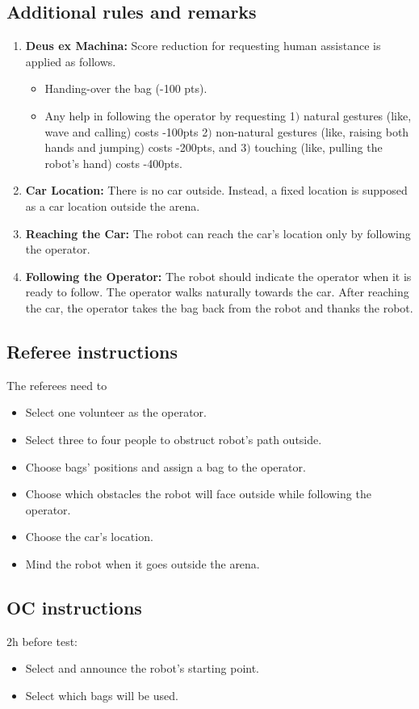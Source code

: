 \subsection{Additional rules and remarks}
\begin{enumerate}[nosep]
	\item \textbf{Deus ex Machina:} Score reduction for requesting human assistance is applied as follows.
	\begin{itemize}
		\item Handing-over the bag (-100 pts).
		\item Any help in following the operator by requesting 1$)$ natural gestures (like, wave and calling) costs -100pts 2$)$ non-natural gestures (like, raising both hands and jumping) costs -200pts, and 3$)$ touching (like, pulling the robot's hand) costs -400pts.
	\end{itemize}

	\item \textbf{Car Location:} There is no car outside. Instead, a fixed location is supposed as a car location outside the arena.

	\item \textbf{Reaching the Car:} The robot can reach the car's location only by following the operator.
	
	\item \textbf{Following the Operator:} The robot should indicate the operator when it is ready to follow. The operator walks naturally towards the car. After reaching the car, the operator takes the bag back from the robot and thanks the robot.
	
\end{enumerate}


\subsection{Referee instructions}

The referees need to
\begin{itemize}
	\item Select one volunteer as the operator.
	\item Select three to four people to obstruct robot's path outside.
	\item Choose bags' positions and assign a bag to the operator.
	\item Choose which obstacles the robot will face outside while following the operator.
	\item Choose the car's location.
	\item Mind the robot when it goes outside the arena.
\end{itemize}

\subsection{OC instructions}

2h before test:
\begin{itemize}
	\item Select and announce the robot's starting point.
	\item Select which bags will be used.
\end{itemize}

% 
